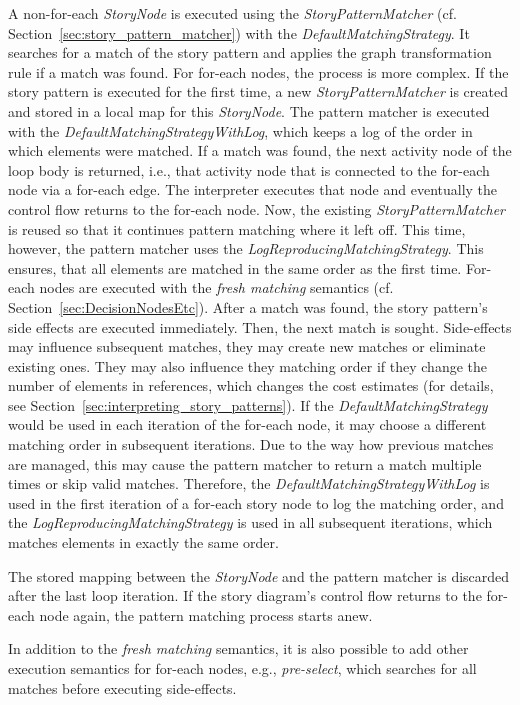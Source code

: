 A non-for-each \emph{StoryNode} is executed using the \emph{StoryPatternMatcher} (cf. Section~\ref{sec:story_pattern_matcher}) with the \emph{DefaultMatchingStrategy}. 
It searches for a match of the story pattern and applies the graph transformation rule if a match was found. 
For for-each nodes, the process is more complex. 
If the story pattern is executed for the first time, a new \emph{StoryPatternMatcher} is created and stored in a local map for this \emph{StoryNode}. 
The pattern matcher is executed with the \emph{DefaultMatchingStrategyWithLog}, which keeps a log of the order in which elements were matched. 
If a match was found, the next activity node of the loop body is returned, i.e., that activity node that is connected to the for-each node via a for-each edge. 
The interpreter executes that node and eventually the control flow returns to the for-each node.
Now, the existing \emph{StoryPatternMatcher} is reused so that it continues pattern matching where it left off. 
This time, however, the pattern matcher uses the \emph{LogReproducingMatchingStrategy}. 
This ensures, that all elements are matched in the same order as the first time. 
For-each nodes are executed with the \emph{fresh matching} semantics (cf. Section~\ref{sec:DecisionNodesEtc}). 
After a match was found, the story pattern's side effects are executed immediately. 
Then, the next match is sought. 
Side-effects may influence subsequent matches, they may create new matches or eliminate existing ones. 
They may also influence they matching order if they change the number of elements in references, which changes the cost estimates (for details, see Section~\ref{sec:interpreting_story_patterns}). 
If the \emph{DefaultMatchingStrategy} would be used in each iteration of the for-each node, it may choose a different matching order in subsequent iterations. 
Due to the way how previous matches are managed, this may cause the pattern matcher to return a match multiple times or skip valid matches.
Therefore, the \emph{DefaultMatchingStrategyWithLog} is used in the first iteration of a for-each story node to log the matching order, and the \emph{LogReproducingMatchingStrategy} is used in all subsequent iterations, which matches elements in exactly the same order.

The stored mapping between the \emph{StoryNode} and the pattern matcher is discarded after the last loop iteration. 
If the story diagram's control flow returns to the for-each node again, the pattern matching process starts anew.

In addition to the \emph{fresh matching} semantics, it is also possible to add other execution semantics for for-each nodes, e.g., \emph{pre-select}, which searches for all matches before executing side-effects.


